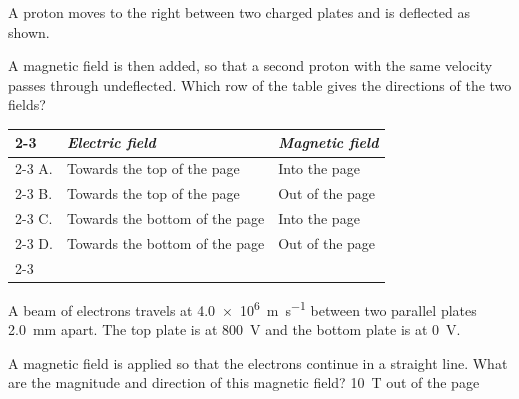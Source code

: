 \begin{quizq}{}
A proton moves to the right between two charged plates and is deflected as shown.
\begin{center}
\end{center}
A magnetic field is then added, so that a second proton with the same velocity passes through
undeflected. Which row of the table gives the directions of the two fields?
\begin{center}
  \renewcommand\arraystretch{1.7}
  \begin{tabular}{@{}p{10mm}|>{\centering\arraybackslash}p{50mm}|>{\centering\arraybackslash}p{40mm}|}
    \cline{2-3}
    & \textit{Electric field} & \textit{Magnetic field}\\ \cline{2-3}
    A. & Towards the top of the page & Into the page\\ \cline{2-3}
    B. & Towards the top of the page & Out of the page\\ \cline{2-3}
    C. & Towards the bottom of the page & Into the page\\ \cline{2-3}
    D. & Towards the bottom of the page & Out of the page\\ \cline{2-3}
  \end{tabular}
\end{center}
\end{quizq}

\begin{quizq}{}
A beam of electrons travels at \qty{4.0e6}{m.s^{-1}} between two parallel plates \qty{2.0}{mm} apart.
The top plate is at \qty[retain-explicit-plus]{+800}{V} and the bottom plate is at \qty{0}{V}.
\begin{center}
\end{center}
A magnetic field is applied so that the electrons continue in a straight line. What are the magnitude
and direction of this magnetic field?
  {\qty{10}{T} out of the page}
\end{quizq}


